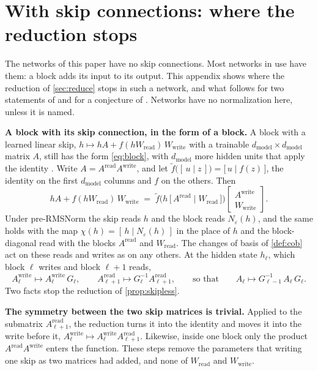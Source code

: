 \documentclass[10pt]{article}
\theoremstyle{definition}
\theoremstyle{remark}
\newcommand{\Wread}{W_{\mathrm{read}}}
\newcommand{\Wwrite}{W_{\mathrm{write}}}
\newcommand{\dm}{d_{\mathrm{model}}}
\newcommand{\para}[1]{\smallskip\noindent\textbf{#1}\hspace{0.5em}}
\begin{document}
\FloatBarrier
\section{With skip connections: where the reduction stops}\label{app:skips}

The networks of this paper have no skip connections. Most networks in use have them: a block adds its input to its output. This appendix shows where the reduction of \cref{sec:reduce} stops in such a network, and what follows for two statements of \citet{wang2025gauge} and for a conjecture of \citet{henry2026generic}. Networks have no normalization here, unless it is named.

\para{A block with its skip connection, in the form of a block.} A block with a learned linear skip, $h \mapsto hA + f(h\Wread)\,\Wwrite$ with a trainable $\dm\times\dm$ matrix $A$, still has the form \eqref{eq:block}, with $\dm$ more hidden units that apply the identity \citep[Section~4]{lin2018resnet}. Write $A = A^{\mathrm{read}}A^{\mathrm{write}}$, and let $\tilde f\big([\,u \mid z\,]\big) = \big[\,u \mid f(z)\,\big]$, the identity on the first $\dm$ columns and $f$ on the others. Then
\[
hA + f(h\Wread)\,\Wwrite \;=\; \tilde f\Big(h\,\big[\,A^{\mathrm{read}} \mid \Wread\,\big]\Big)\begin{bmatrix} A^{\mathrm{write}} \\ \Wwrite \end{bmatrix}.
\]
Under pre-RMSNorm the skip reads $h$ and the block reads $N_\varepsilon(h)$, and the same holds with the map $\chi(h) = [\,h \mid N_\varepsilon(h)\,]$ in the place of $h$ and the block-diagonal read with the blocks $A^{\mathrm{read}}$ and $\Wread$. The changes of basis of \cref{def:cob} act on these reads and writes as on any others. At the hidden state $h_\ell$, which block $\ell$ writes and block $\ell+1$ reads,
\[
A^{\mathrm{write}}_\ell \mapsto A^{\mathrm{write}}_\ell\,G_\ell, \qquad A^{\mathrm{read}}_{\ell+1} \mapsto G_\ell^{-1}A^{\mathrm{read}}_{\ell+1}, \qquad\text{so that}\qquad A_\ell \mapsto G_{\ell-1}^{-1}\,A_\ell\,G_\ell .
\]
Two facts stop the reduction of \cref{prop:skipless}.

\para{The symmetry between the two skip matrices is trivial.} Applied to the submatrix $A^{\mathrm{read}}_{\ell+1}$, the reduction turns it into the identity and moves it into the write before it, $A^{\mathrm{write}}_\ell \mapsto A^{\mathrm{write}}_\ell A^{\mathrm{read}}_{\ell+1}$. Likewise, inside one block only the product $A^{\mathrm{read}}A^{\mathrm{write}}$ enters the function. These steps remove the parameters that writing one skip as two matrices had added, and none of $\Wread$ and $\Wwrite$.
\end{document}

